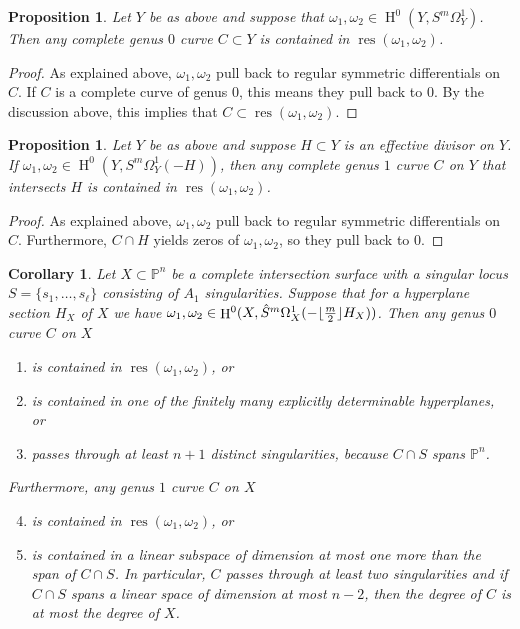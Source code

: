 \documentclass[12pt, reqno]{amsart}
\DeclarePairedDelimiter{\floor}{\lfloor}{\rfloor}
\newtheorem{prop}[lemma]{Proposition}
\newtheorem{cor}[lemma]{Corollary}
\theoremstyle{definition}
\newcommand{\PP}{{\mathbb P}}
\DeclareMathOperator{\HH}{H}
\DeclareMathOperator{\res}{res}
\numberwithin{equation}{section}
\numberwithin{table}{section}
\begin{document}
\begin{prop}\label{P:explicit_resultant_locus_g0}
	Let $Y$ be as above and suppose that $\omega_1,\omega_2\in \HH^0(Y,S^m\Omega^1_Y)$. Then any complete genus $0$ curve $C\subset Y$ is contained in $\res(\omega_1,\omega_2)$.
\end{prop}

\begin{proof}
As explained above, $\omega_1,\omega_2$ pull back to regular symmetric differentials on $C$. If $C$ is a complete curve of genus $0$, this means they pull back to $0$. By the discussion above, this implies that $C\subset \res(\omega_1,\omega_2)$.
\end{proof}

\begin{prop}\label{P:explicit_resultant_locus_g1}
	Let $Y$ be as above and suppose $H\subset Y$ is an effective divisor on $Y$. If $\omega_1,\omega_2\in \HH^0(Y,S^m\Omega^1_Y(-H))$, then any complete genus $1$ curve $C$ on $Y$ that intersects $H$ is contained in $\res(\omega_1,\omega_2)$.
\end{prop}
\begin{proof}
As explained above, $\omega_1,\omega_2$ pull back to regular symmetric differentials on $C$. Furthermore, $C\cap H$ yields zeros of $\omega_1,\omega_2$, so they pull back to $0$.
\end{proof}

\begin{cor}\label{C:explicit_resultant_locus}
	Let $X\subset\PP^n$ be a complete intersection surface with a singular locus $S=\{s_1,\ldots,s_\ell\}$ consisting of $A_1$ singularities. Suppose that for a hyperplane section $H_X$ of $X$ we have $\omega_1,\omega_2\in \HH^0(X,\hat{S}^m\Omega^1_X(-\floor{\frac{m}{2}} H_X))$. Then any genus $0$ curve $C$ on $X$
	\begin{enumerate}
		\item is contained in $\res(\omega_1,\omega_2)$, or
		\item is contained in one of the finitely many explicitly determinable hyperplanes, or
		\item passes through at least $n+1$ distinct singularities, because $C\cap S$ spans $\PP^n$.
	\end{enumerate}
Furthermore, any genus $1$ curve $C$ on $X$
	\begin{enumerate}
		\setcounter{enumi}{3}
		\item is contained in $\res(\omega_1,\omega_2)$, or
		\item is contained in a linear subspace of dimension at most one more than the span of $C\cap S$. In particular, $C$ passes through at least two singularities and if $C\cap S$ spans a linear space of dimension at most $n-2$, then the degree of $C$ is at most the degree of $X$.
	\end{enumerate}
\end{cor}
\end{document}
